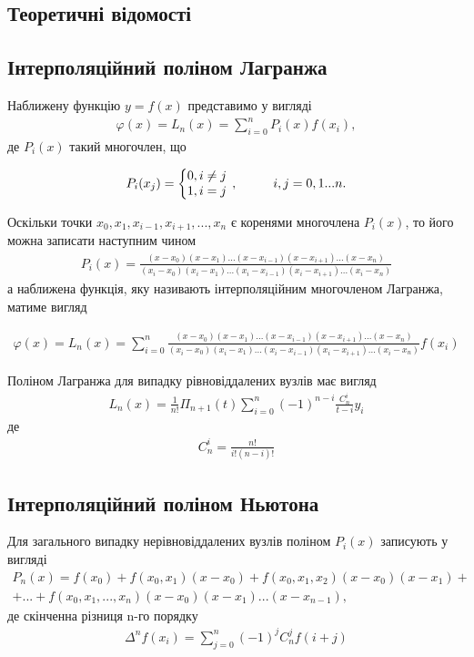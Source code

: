 \documentclass{article}
\begin{document}
\begin{large}
		\section*{Теоретичні відомості}
		\subsection*{Інтерполяційний поліном Лагранжа}
		Наближену функцію $y=f(x)$ представимо у вигляді 
		\begin{gather}
			\varphi(x)=L_n(x)=\sum_{i=0}^{n}P_i(x)f(x_i),\nonumber
		\end{gather}
		де $P_i(x)$ такий многочлен, що
		
		\begin{gather}
			P_i(x_j)=\left\{\begin{array}{@{}l@{}}
				0, i \ne j\\\nonumber
				1, i = j\nonumber
			\end{array}\right.\,
			, \hspace{28pt} i, j=0,1...n.
		\end{gather}
	
		Оскільки точки $x_0, x_1, x_{i-1}, x_{i+1}, ..., x_n$ є коренями многочлена $P_i(x)$, то його можна записати наступним чином
		\begin{gather}
			P_i(x)=\frac{(x-x_0)(x-x_1)...(x-x_{i-1})(x-x_{i+1})...(x-x_n)}{(x_i-x_0)(x_i-x_1)...(x_i-x_{i-1})(x_i-x_{i+1})...(x_i-x_n)}\nonumber
		\end{gather}
		а наближена функція, яку називають інтерполяційним многочленом Лагранжа, матиме вигляд
		
		\begin{gather}
			\varphi(x)=L_n(x)=\sum_{i=0}^{n}\frac{(x-x_0)(x-x_1)...(x-x_{i-1})(x-x_{i+1})...(x-x_n)}{(x_i-x_0)(x_i-x_1)...(x_i-x_{i-1})(x_i-x_{i+1})...(x_i-x_n)}f(x_i)\nonumber
		\end{gather}
		
		Поліном Лагранжа для випадку рівновіддалених вузлів має вигляд
		\begin{gather}
			L_n(x)=\frac{1}{n!}\Pi_{n+1}(t)\sum_{i=0}^{n}(-1)^{n-i}\frac{C_n^i}{t-i}y_i\nonumber
		\end{gather}
		де
		\begin{gather}
			C_n^i=\frac{n!}{i!(n-i)!}\nonumber
		\end{gather}
		 
		\subsection*{Інтерполяційний поліном Ньютона}
		Для загального випадку нерівновіддалених вузлів поліном $P_i(x)$ записують у вигляді
		\begin{gather}\nonumber
			P_n(x)=f(x_0)+f(x_0, x_1)(x-x_0)+f(x_0,x_1,x_2)(x-x_0)(x-x_1)+\\
			+...+f(x_0,x_1,...,x_n)(x-x_0)(x-x_1)...(x-x_{n-1}),\nonumber
		\end{gather}
		де скінченна різниця n-го порядку
		\begin{gather}
			\Delta^nf(x_i)=\sum_{j=0}^{n}(-1)^jC_n^jf(i+j)\nonumber
		\end{gather}

\end{large}
\end{document}
